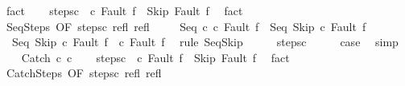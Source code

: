 \begin{isabellebody}
\ fact\isanewline
\ \ \isamarkupfalse%
\ steps{\isacharunderscore}c\ {\isachardoublequoteopen}{\isasymGamma}{\isasymturnstile}\ {\isacharparenleft}c\ Fault\ f{\isacharparenright}\ {\isasymrightarrow}\isactrlsup {\isacharasterisk}\ {\isacharparenleft}Skip{\isacharcomma}\ Fault\ f{\isacharparenright}{\isachardoublequoteclose}\ \isamarkupfalse%
\ fact\isanewline
\ \ \isamarkupfalse%
\ SeqSteps\ {\isacharbrackleft}OF\ steps{\isacharunderscore}c\ refl\ refl{\isacharbrackright}\isanewline
\ \ \isamarkupfalse%
\ {\isachardoublequoteopen}{\isasymGamma}{\isasymturnstile}\ {\isacharparenleft}Seq\ c\ c\ Fault\ f{\isacharparenright}\ {\isasymrightarrow}\isactrlsup {\isacharasterisk}\ {\isacharparenleft}Seq\ Skip\ c\ Fault\ f{\isacharparenright}{\isachardoublequoteclose}\isacommand{{\isachardot}}\isamarkupfalse%
\isanewline
\ \ \isamarkupfalse%
\isanewline
\ \ \isamarkupfalse%
\ {\isachardoublequoteopen}{\isasymGamma}{\isasymturnstile}\ {\isacharparenleft}Seq\ Skip\ c\ Fault\ f{\isacharparenright}\ {\isasymrightarrow}\ {\isacharparenleft}c\ Fault\ f{\isacharparenright}{\isachardoublequoteclose}\ \isamarkupfalse%
\ {\isacharparenleft}rule\ SeqSkip{\isacharparenright}\isanewline
\ \ \isamarkupfalse%
\ \isamarkupfalse%
\ steps{\isacharunderscore}c\isanewline
\ \ \isamarkupfalse%
\ \isamarkupfalse%
\ {\isacharquery}case\ \isamarkupfalse%
\ simp\isanewline
{}\isamarkupfalse%
\isanewline
\ \ \isamarkupfalse%
\ {\isacharparenleft}Catch\ c\ c\isanewline
\ \ \isamarkupfalse%
\ steps{\isacharunderscore}c\ {\isachardoublequoteopen}{\isasymGamma}{\isasymturnstile}\ {\isacharparenleft}c\ Fault\ f{\isacharparenright}\ {\isasymrightarrow}\isactrlsup {\isacharasterisk}\ {\isacharparenleft}Skip{\isacharcomma}\ Fault\ f{\isacharparenright}{\isachardoublequoteclose}\ \isamarkupfalse%
\ fact\isanewline
\ \ \isamarkupfalse%
\ CatchSteps\ {\isacharbrackleft}OF\ steps{\isacharunderscore}c\ refl\ refl{\isacharbrackright}\isanewline

\end{isabellebody}
